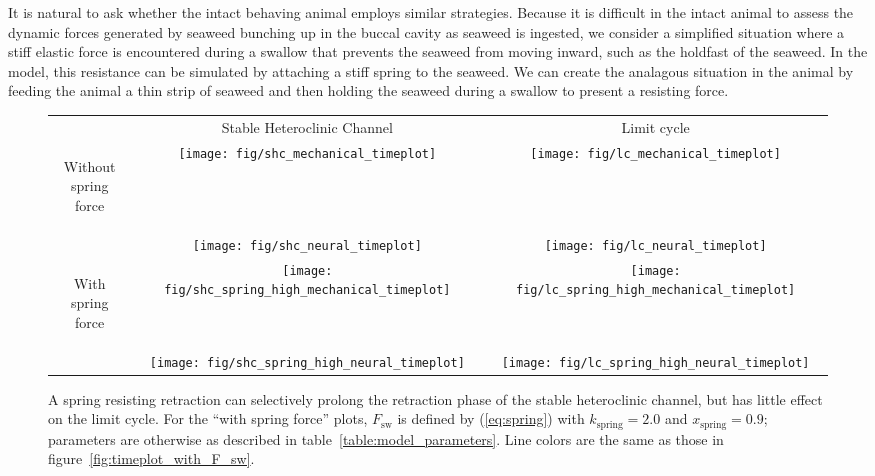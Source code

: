 It is natural to ask whether the intact behaving animal employs similar
strategies.  Because it is difficult in the intact animal to assess the dynamic
forces generated by seaweed bunching up in the buccal cavity as seaweed is
ingested, we consider a simplified situation where a stiff elastic force is
encountered during a swallow that prevents the seaweed from moving inward, such
as the holdfast of the seaweed.  In the model, this resistance can be simulated by
attaching a stiff spring to the seaweed.  We can create the
analagous situation in the animal by feeding the animal a thin strip of seaweed
and then holding the seaweed during a swallow to present a resisting force.

\begin{figure}
    \centering
    \begin{tabular}{cc@{}c}
        & Stable Heteroclinic Channel & Limit cycle \\
        \begin{sideways}\hskip -10mm\parbox{20mm}{\centering Without\\spring force}\end{sideways} &
            \texttt{[image: fig/shc\_mechanical\_timeplot]} &
            \texttt{[image: fig/lc\_mechanical\_timeplot]} \\
        &
            \texttt{[image: fig/shc\_neural\_timeplot]} &
            \texttt{[image: fig/lc\_neural\_timeplot]} \\[1 em]
        \begin{sideways}\hskip -10mm\parbox{20mm}{\centering With\\spring force}\end{sideways} &
            \texttt{[image: fig/shc\_spring\_high\_mechanical\_timeplot]} &
            \texttt{[image: fig/lc\_spring\_high\_mechanical\_timeplot]} \\
        &
            \texttt{[image: fig/shc\_spring\_high\_neural\_timeplot]} &
            \texttt{[image: fig/lc\_spring\_high\_neural\_timeplot]} \\
    \end{tabular}
    \caption[Simulation of held seaweed]{
    A spring resisting retraction can selectively prolong the retraction phase of
    the stable heteroclinic channel, but has little effect on the limit cycle.  For the ``with spring force'' plots,
    $F_\textrm{sw}$ is defined by (\ref{eq:spring}) with $k_\textrm{spring}=2.0$ and
    $x_\textrm{spring}=0.9$; parameters are otherwise as described in
    table~\ref{table:model_parameters}.  Line colors are the same as those in
    figure~\ref{fig:timeplot_with_F_sw}.
    }
    \label{fig:timeplot_with_spring}
\end{figure}

